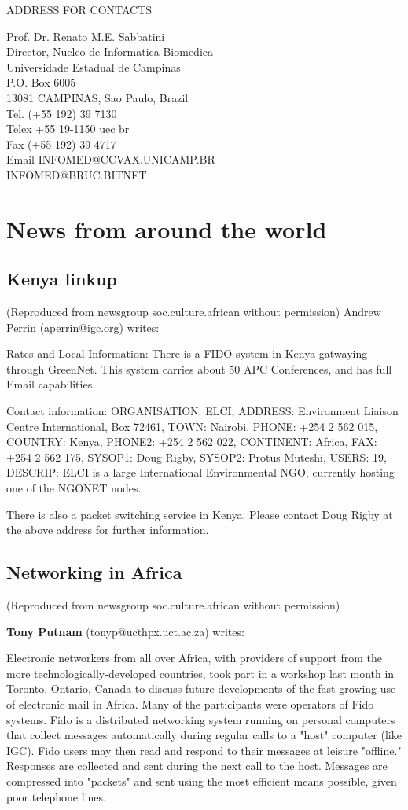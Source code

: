 ADDRESS FOR CONTACTS
 
Prof. Dr. Renato M.E. Sabbatini\\
Director, Nucleo de Informatica Biomedica\\
Universidade Estadual de Campinas\\
P.O. Box 6005\\
13081 CAMPINAS, Sao Paulo, Brazil\\
Tel. (+55 192) 39 7130\\
Telex +55 19-1150 uec br\\
Fax (+55 192) 39 4717\\
Email  INFOMED@CCVAX.UNICAMP.BR\\
       INFOMED@BRUC.BITNET

\section{News from around the world}
\subsection{Kenya linkup}
(Reproduced from newsgroup soc.culture.african without permission)
Andrew Perrin (aperrin@igc.org) writes:

Rates and Local Information: There is a FIDO system in Kenya gatwaying
through GreenNet.  This system carries about 50 APC Conferences, and
has full Email capabilities. 

Contact information: ORGANISATION: ELCI, ADDRESS: Environment Liaison
Centre International, Box 72461, TOWN: Nairobi, PHONE: +254 2 562 015,
COUNTRY: Kenya, PHONE2: +254 2 562 022, CONTINENT: Africa, FAX: +254 2 562 175,
SYSOP1: Doug Rigby, SYSOP2: Protus Muteshi, USERS: 19, DESCRIP: ELCI
is a large International Environmental NGO, currently hosting one of
the NGONET nodes.

There is also a packet switching service in Kenya.  Please contact Doug
Rigby at the above address for further information.

\subsection{Networking in Africa}
(Reproduced from newsgroup soc.culture.african without permission)

{\bf Tony Putnam} (tonyp@ucthpx.uct.ac.za) writes:

Electronic networkers from all over Africa, with providers of support
from the more technologically-developed countries, took part in a
workshop last month in Toronto, Ontario, Canada to discuss future
developments of the fast-growing use of electronic mail in Africa.
Many of the participants were operators of Fido systems.  Fido is a
distributed networking system running on personal computers that
collect messages automatically during regular calls to a "host"
computer (like IGC).  Fido users may then read and respond to their
messages at leisure "offline."  Responses are collected and sent during
the next call to the host.  Messages are compressed into "packets"
and sent using the most efficient means possible, given poor
telephone lines.

